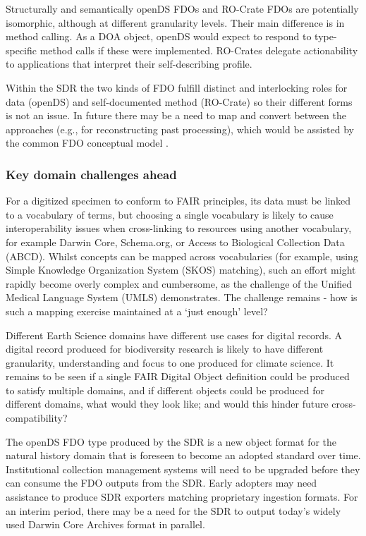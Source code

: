 Structurally and semantically openDS FDOs and RO-Crate FDOs are
potentially isomorphic, although at different granularity levels. Their
main difference is in method calling. As a DOA object, openDS would
expect to respond to type-specific method calls if these were
implemented. RO-Crates delegate actionability to applications that
interpret their self-describing profile.

Within the SDR the two kinds of FDO fulfill distinct and interlocking
roles for data (openDS) and self-documented method (RO-Crate) so their
different forms is not an issue. In future there may be a need to map
and convert between the approaches (e.g., for reconstructing past
processing), which would be assisted by the common FDO conceptual model
\cite{Bonino 2019}.

\subsubsection{Key domain challenges ahead}\label{key-domain-challenges-ahead}

For a digitized specimen to conform to FAIR principles, its data must be
linked to a vocabulary of terms, but choosing a single vocabulary is
likely to cause interoperability issues when cross-linking to resources
using another vocabulary, for example Darwin Core, Schema.org, or Access
to Biological Collection Data (ABCD). Whilst concepts can be mapped
across vocabularies (for example, using Simple Knowledge Organization
System (SKOS) matching), such an effort might rapidly become overly
complex and cumbersome, as the challenge of the Unified Medical Language
System (UMLS) demonstrates. The challenge remains - how is such a
mapping exercise maintained at a `just enough' level?

Different Earth Science domains have different use cases for digital
records. A digital record produced for biodiversity research is likely
to have different granularity, understanding and focus to one produced
for climate science. It remains to be seen if a single FAIR Digital
Object definition could be produced to satisfy multiple domains, and if
different objects could be produced for different domains, what would
they look like; and would this hinder future cross-compatibility?

The openDS FDO type produced by the SDR is a new object format for the
natural history domain that is foreseen to become an adopted standard
over time. Institutional collection management systems will need to be
upgraded before they can consume the FDO outputs from the SDR. Early
adopters may need assistance to produce SDR exporters matching
proprietary ingestion formats. For an interim period, there may be a
need for the SDR to output today's widely used Darwin Core Archives
format in parallel.

